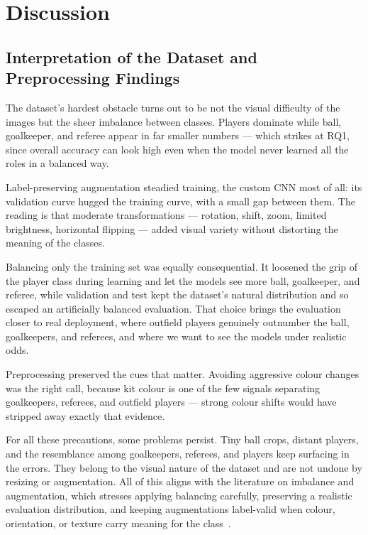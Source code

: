 \documentclass[preprint,12pt]{elsarticle}
\begin{document}
\section{Discussion}
\label{sec:discussion}

\subsection{Interpretation of the Dataset and Preprocessing Findings}

The dataset's hardest obstacle turns out to be not the visual difficulty of the images but the sheer imbalance between classes. Players dominate while ball, goalkeeper, and referee appear in far smaller numbers --- which strikes at RQ1, since overall accuracy can look high even when the model never learned all the roles in a balanced way.

Label-preserving augmentation steadied training, the custom CNN most of all: its validation curve hugged the training curve, with a small gap between them. The reading is that moderate transformations --- rotation, shift, zoom, limited brightness, horizontal flipping --- added visual variety without distorting the meaning of the classes.

Balancing only the training set was equally consequential. It loosened the grip of the player class during learning and let the models see more ball, goalkeeper, and referee, while validation and test kept the dataset's natural distribution and so escaped an artificially balanced evaluation. That choice brings the evaluation closer to real deployment, where outfield players genuinely outnumber the ball, goalkeepers, and referees, and where we want to see the models under realistic odds.

Preprocessing preserved the cues that matter. Avoiding aggressive colour changes was the right call, because kit colour is one of the few signals separating goalkeepers, referees, and outfield players --- strong colour shifts would have stripped away exactly that evidence.

For all these precautions, some problems persist. Tiny ball crops, distant players, and the resemblance among goalkeepers, referees, and players keep surfacing in the errors. They belong to the visual nature of the dataset and are not undone by resizing or augmentation. All of this aligns with the literature on imbalance and augmentation, which stresses applying balancing carefully, preserving a realistic evaluation distribution, and keeping augmentations label-valid when colour, orientation, or texture carry meaning for the class~\cite{ghosh2024imbalance,lewy2023augmentation}.
\end{document}
